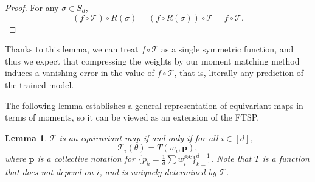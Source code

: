 \documentclass{article}
\theoremstyle{plain}
\newtheorem{lemma}{Lemma}
\def\HYW#1{{\color[HTML]{E97451}[#1]}}
\begin{document}
\begin{proof}
    For any $\sigma\in S_d$, 
    \begin{equation}
        (f\circ\mathcal{T})\circ R(\sigma) = (f\circ R(\sigma)) \circ \mathcal{T}
        = f\circ\mathcal{T} .
    \end{equation}
\end{proof}

Thanks to this lemma, we can treat $f \circ \mathcal{T}$ as a single symmetric function, and thus we expect that compressing the weights by our moment matching method induces a vanishing error in the value of $f \circ \mathcal{T}$, that is, literally any prediction of the trained model. 



The following lemma establishes a general representation of equivariant maps in terms of moments, so it can be viewed as an extension of the FTSP. 

\begin{lemma}\label{lemma:ev_fund_rep}
    $\mathcal{T}$ is an equivariant map if and only if for all $i\in[d]$, 
    \begin{equation}    \label{eq:ev_fundamental_rep}
        \mathcal{T}_i (\theta) = T(w_i, \bm{p}) ,
    \end{equation}
    where $\bm{p}$ is a collective notation for $\{p_k = \frac{1}{d}\sum w_i^{\otimes k}\}_{k=1}^{d-1}$. Note that $T$ is a function that does not depend on $i$, and is uniquely determined by $\mathcal{T}$. 
\end{lemma}
\end{document}
